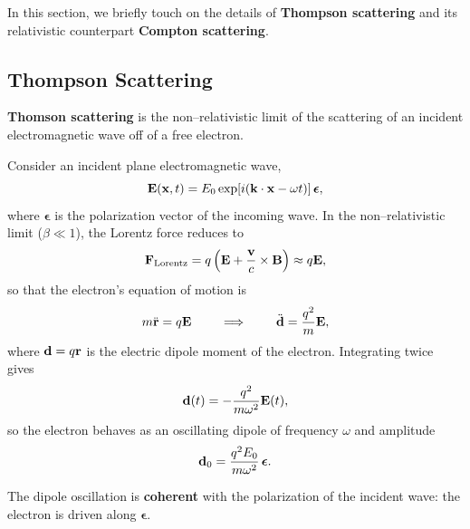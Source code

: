 In this section, we briefly touch on the details of \textbf{Thompson scattering} and its relativistic counterpart \textbf{Compton scattering}. 

\subsection{Thompson Scattering}

\begin{definition}
    \label{def:thomson_scattering}
    \textbf{Thomson scattering} is the non--relativistic limit of the
    scattering of an incident electromagnetic wave off of a free
    electron.
\end{definition}

\noindent
Consider an incident plane electromagnetic wave,
\[
    {\bf E}({\bf x},t) = E_0 \exp\!\left[i({\bf k}\cdot{\bf x} - \omega t)\right]\boldsymbol{\epsilon},
\]
where $\boldsymbol{\epsilon}$ is the polarization vector of the incoming
wave. In the non--relativistic limit ($\beta \ll 1$), the Lorentz force
reduces to
\[
    {\bf F}_{\rm Lorentz} = q\left({\bf E} + \frac{\mathbf{v}}{c}\times {\bf B}\right)
    \approx q{\bf E},
\]
so that the electron’s equation of motion is
\[
    m\ddot{\bf r} = q{\bf E} \qquad \implies \qquad
    \ddot{\bf d} = \frac{q^2}{m}{\bf E},
\]
where ${\bf d} = q{\bf r}$ is the electric dipole moment of the electron.
Integrating twice gives
\[
    {\bf d}(t) = -\frac{q^2}{m\omega^2}{\bf E}(t),
\]
so the electron behaves as an oscillating dipole of frequency $\omega$
and amplitude
\[
    {\bf d}_0 = \frac{q^2E_0}{m\omega^2}\,\boldsymbol{\epsilon}.
\]
\begin{remark}
    The dipole oscillation is \textbf{coherent} with the polarization of
    the incident wave: the electron is driven along
    $\boldsymbol{\epsilon}$.
\end{remark}

